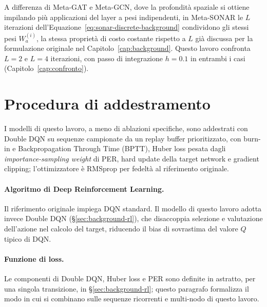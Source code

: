A differenza di Meta-GAT e Meta-GCN, dove la profondità spaziale si ottiene
impilando più applicazioni del layer a pesi indipendenti, in Meta-SONAR le
$L$ iterazioni dell'Equazione~\ref{eq:sonar-discrete-background} condividono
gli stessi pesi $W_{a}^{(i)}$, la stessa proprietà di costo
costante rispetto a $L$ già discussa per la formulazione originale nel
Capitolo~\ref{cap:background}. Questo lavoro confronta $L=2$ e $L=4$
iterazioni, con passo di integrazione $h=0.1$ in entrambi i casi
(Capitolo~\ref{cap:confronto}).

\section{Procedura di addestramento}
\label{sec:training}

I modelli di questo lavoro, a meno di ablazioni specifiche, sono
addestrati con Double DQN su sequenze campionate da un replay buffer
prioritizzato, con burn-in e Backpropagation Through Time (BPTT), Huber
loss pesata dagli \emph{importance-sampling weight} di PER, hard update
della target network e gradient clipping; l'ottimizzatore è RMSprop per
fedeltà al riferimento originale.

\paragraph{Algoritmo di Deep Reinforcement Learning.} Il riferimento
originale impiega DQN standard. Il modello di questo lavoro adotta invece
Double DQN \citep{vanhasselt2016double} (§\ref{sec:background-rl}), che
disaccoppia selezione e valutazione dell'azione nel calcolo del target,
riducendo il bias di sovrastima del valore $Q$ tipico di DQN.

\paragraph{Funzione di loss.}
Le componenti di Double DQN, Huber loss e PER
sono definite in astratto, per una singola transizione, in
§\ref{sec:background-rl}; questo paragrafo formalizza il modo in cui si combinano sulle sequenze
ricorrenti e multi-nodo di questo lavoro.

